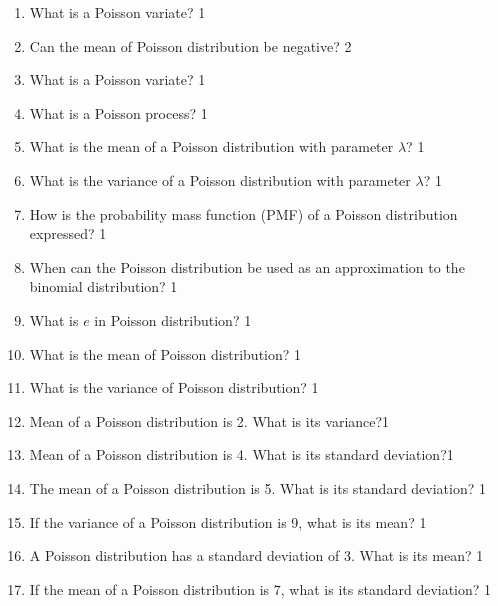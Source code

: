 \documentclass[a4paper,oneside, margin=1.4in]{book}
\begin{document}
\begin{enumerate}

    \item
	What is a Poisson variate? \hfill 1
    \item
	Can the mean of Poisson distribution be negative? \hfill 2

  \item What is a Poisson variate? \hfill 1
  
  \item What is a Poisson process?  \hfill 1
  
  \item What is the mean of a Poisson distribution with parameter \( \lambda \)? \hfill 1

\item What is the variance of a Poisson distribution with parameter \( \lambda \)? \hfill 1

\item How is the probability mass function (PMF) of a Poisson distribution expressed? \hfill 1

\item When can the Poisson distribution be used as an approximation to the binomial distribution? \hfill 1

\item What is $e$ in Poisson distribution? \hfill 1

\item What is the mean of Poisson distribution? \hfill 1

\item What is the variance of Poisson distribution? \hfill 1

\item Mean of a Poisson distribution is 2. What is its variance?\hfill 1

\item Mean of a Poisson distribution is 4. What is its standard deviation?\hfill 1

\item The mean of a Poisson distribution is 5. What is its standard deviation? \hfill 1

\item If the variance of a Poisson distribution is 9, what is its mean? \hfill 1

\item A Poisson distribution has a standard deviation of 3. What is its mean? \hfill 1

\item If the mean of a Poisson distribution is 7, what is its standard deviation? \hfill 1


\end{enumerate}
\end{document}
